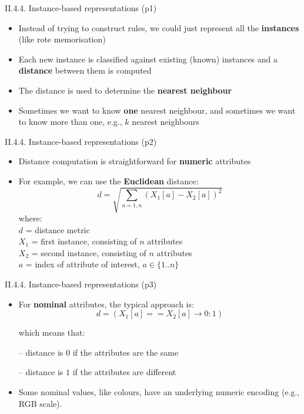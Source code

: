 \documentclass[handout]{beamer}
\newcommand{\strong}[1]{\textbf{\color{teal} #1}}
\begin{document}
\begin{frame}{II.4.4. Instance-based representations (p1)}
\begin{itemize}
\item Instead of trying to construct rules, we could just represent all the \strong{instances} (like rote memorisation)
\item[]
\item Each new instance is classified against existing (known) instances and a \strong{distance} between them is computed
\item[]
\item The distance is used to determine the \strong{nearest neighbour}
\item Sometimes we want to know \textbf{one} nearest neighbour, and sometimes we want to know more than one, e.g., \textbf{$k$} nearest neighbours
\end{itemize}
\end{frame}
\begin{frame}{II.4.4. Instance-based representations (p2)}
\begin{itemize}
\item Distance computation is straightforward for \strong{numeric} attributes
\item For example, we can use the \strong{Euclidean} distance:
\[
	d = \sqrt{ \sum_{a=1,n}{ (X_1[a] - X_2[a]) ^2 }}
\]
where:\\
$d$ = distance metric\\
$X_1$ = first instance, consisting of $n$ attributes\\
$X_2$ = second instance, consisting of $n$ attributes\\
$a$ = index of attribute of interest, $a \in \{1..n\}$
\end{itemize}
\end{frame}
\begin{frame}{II.4.4. Instance-based representations (p3)}
\begin{itemize}
\item For \strong{nominal} attributes, the typical approach is:
\[
	d = ( X_1[a] == X_2[a] \rightarrow 0 : 1 )
\]
\item[] which means that:
\item[--] distance is $0$ if the attributes are the same
\item[--] distance is $1$ if the attributes are different
\item Some nominal values, like colours, have an underlying numeric encoding (e.g., RGB scale).
\end{itemize}
\end{frame}
\end{document}
